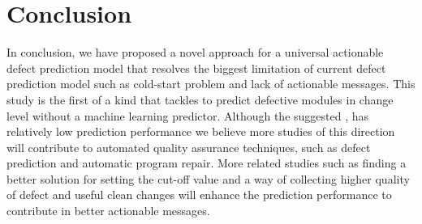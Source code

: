 \section{Conclusion}
In conclusion, we have proposed a novel approach for a universal actionable defect prediction model that resolves the biggest limitation of current defect prediction model such as cold-start problem and lack of actionable messages.
This study is the first of a kind that tackles to predict defective modules in change level without a machine learning predictor. 
Although the suggested {\simfinmo}, has relatively low prediction performance we believe more studies of this direction will contribute to automated quality assurance techniques, such as defect prediction and automatic program repair.
More related studies such as finding a better solution for setting the cut-off value and a way of collecting higher quality of defect and useful clean changes will enhance the prediction performance to contribute in better actionable messages.
